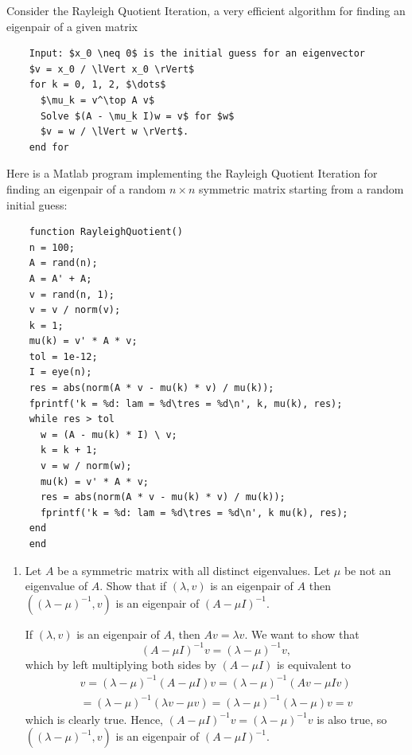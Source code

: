 \documentclass{../../../kin_math}
\begin{document}
\begin{questions}
  \question Consider the Rayleigh Quotient Iteration, a very efficient algorithm for finding an eigenpair of a given matrix
  \begin{lstlisting}
    Input: $x_0 \neq 0$ is the initial guess for an eigenvector
    $v = x_0 / \lVert x_0 \rVert$
    for k = 0, 1, 2, $\dots$
      $\mu_k = v^\top A v$
      Solve $(A - \mu_k I)w = v$ for $w$
      $v = w / \lVert w \rVert$.
    end for
  \end{lstlisting}
  Here is a Matlab program implementing the Rayleigh Quotient Iteration for finding an eigenpair of a random $n \times n$ symmetric matrix starting from a random initial guess:
  \begin{lstlisting}
    function RayleighQuotient()
    n = 100;
    A = rand(n);
    A = A' + A;
    v = rand(n, 1);
    v = v / norm(v);
    k = 1;
    mu(k) = v' * A * v;
    tol = 1e-12;
    I = eye(n);
    res = abs(norm(A * v - mu(k) * v) / mu(k));
    fprintf('k = %d: lam = %d\tres = %d\n', k, mu(k), res);
    while res > tol
      w = (A - mu(k) * I) \ v;
      k = k + 1;
      v = w / norm(w);
      mu(k) = v' * A * v;
      res = abs(norm(A * v - mu(k) * v) / mu(k));
      fprintf('k = %d: lam = %d\tres = %d\n', k mu(k), res);
    end
    end
  \end{lstlisting}
  \begin{enumerate}
    \item Let $A$ be a symmetric matrix with all distinct eigenvalues. Let $\mu$ be not an eigenvalue of $A$. Show that if $(\lambda, v)$ is an eigenpair of $A$ then $((\lambda - \mu)^{-1}, v)$ is an eigenpair of $(A - \mu I)^{-1}$.
    \begin{solution}
      If $(\lambda, v)$ is an eigenpair of $A$, then $Av = \lambda v$. We want to show that
      \begin{equation*}
        (A - \mu I)^{-1} v = (\lambda - \mu)^{-1} v,
      \end{equation*}
      which by left multiplying both sides by $(A - \mu I)$ is equivalent to
      \begin{multline*}
        v = (\lambda - \mu)^{-1} (A - \mu I)v = (\lambda - \mu)^{-1} (Av - \mu Iv) \\
        = (\lambda - \mu)^{-1} (\lambda v - \mu v) = (\lambda - \mu)^{-1} (\lambda - \mu) v = v
      \end{multline*}
      which is clearly true. Hence, $(A - \mu I)^{-1} v = (\lambda - \mu)^{-1} v$ is also true, so $((\lambda - \mu)^{-1}, v)$ is an eigenpair of $(A - \mu I)^{-1}$.
    \end{solution}

\end{enumerate}
\end{questions}
\end{document}
